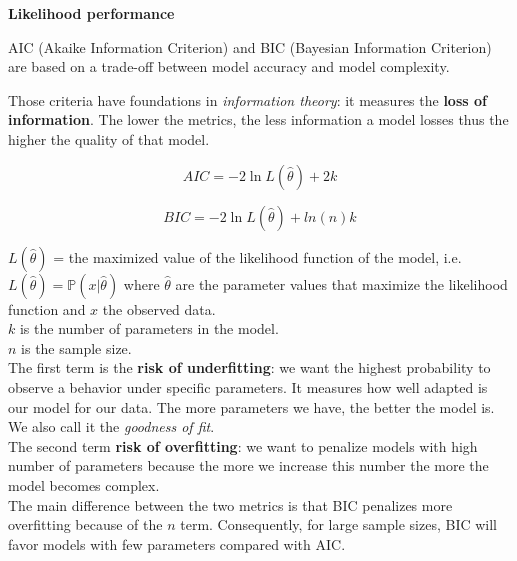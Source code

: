 {\fontsize{12pt}{22pt} \textbf{Likelihood performance}\par}

\vspace{5mm}

AIC (Akaike Information Criterion) and BIC (Bayesian Information Criterion) are based on a trade-off between model accuracy and model complexity.

Those criteria have foundations in \textit{information theory}: it measures the \textbf{loss of information}. The lower the metrics, the less information a model losses thus the higher the quality of that model.

$$AIC = -2\ln L(\hat \theta) + 2k$$

$$BIC = -2\ln L(\hat \theta) + ln(n)k$$

$L(\hat \theta)$ = the maximized value of the likelihood function of the model, i.e. $L(\hat \theta)= \mathbb{P}(x | \hat \theta)$ where $\hat \theta$ are the parameter values that maximize the likelihood function and $x$ the observed data. \\
$k$ is the number of parameters in the model. \\
$n$ is the sample size. \\


The first term is the \textbf{risk of underfitting}: we want the highest probability to observe a behavior under specific parameters. It measures how well adapted is our model for our data. The more parameters we have, the better the model is. We also call it the \textit{goodness of fit}. \\

The second term \textbf{risk of overfitting}: we want to penalize models with high number of parameters because the more we increase this number the more the model becomes complex. \\

The main difference between the two metrics is that BIC penalizes more overfitting because of the $n$ term. Consequently, for large sample sizes, BIC will favor models with few parameters compared with AIC.

\vspace{5mm}